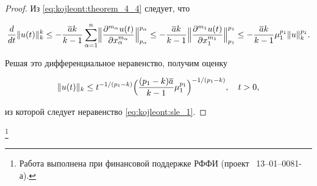 \smallskip



\begin{proof} Из \eqref{eq:kojleont:theorem_4_4}  следует, что

$$

\frac{d}{dt}\|u(t)\|^k_k\leq

-\frac{\overline{a}k}{k-1}\sum_{\alpha=1}^n 

\Bigl\|\frac{\partial^{m_\alpha}u(t)}{\partial x_\alpha^{m_\alpha}} \Bigr\|_{p_{\alpha}}^{p_{\alpha}}\leq-

\frac{\overline{a}k}{k-1}\Bigl\|\frac{\partial^{m_1}u(t)}{\partial x_1^{m_1}}\Bigr\|_{p_1}^{p_1}\leq -\frac{\overline{a}k}{k-1}\mu_1^{p_1}\|

u\|^{p_1}_k.

$$

Решая это дифференциальное неравенство, получим оценку

$$

\|u(t)\|_k\leq

t^{-1/(p_1-k)}\Bigl(\frac{(p_1-k)\overline{a}}{k-1}\mu_1^{p_1}\Bigr)^{-1/(p_1-k)},\quad t>0,

$$

из которой следует неравенство \eqref{eq:kojleont:sle_1}.

\end{proof}





\thanks{Работа выполнена при финансовой поддержке РФФИ (проект \No\ 13--01--0081-а).}



